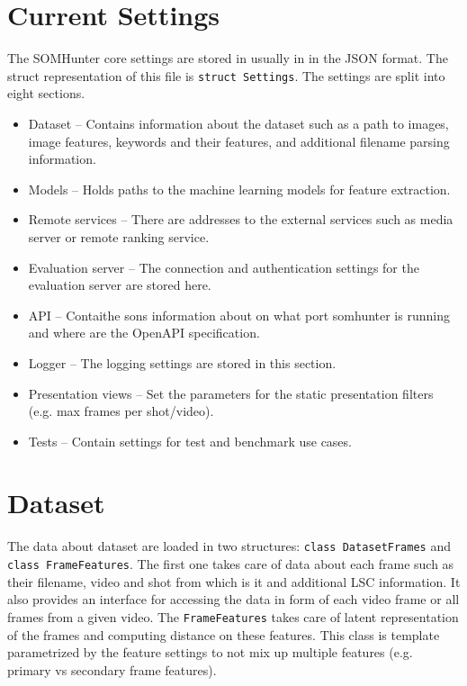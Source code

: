 \section{Current Settings}

The SOMHunter core settings are stored in usually in  in the JSON format. The struct representation of this file is \lstinline{struct Settings}. The settings are split into eight sections.
\begin{itemize}
  \item Dataset -- Contains information about the dataset such as a path to images, image features, keywords and their features, and additional filename parsing information. 
  \item Models -- Holds paths to the machine learning models for feature extraction.
  \item Remote services -- There are addresses to the external services such as media server or remote ranking service.
  \item Evaluation server -- The connection and authentication settings for the evaluation server are stored here.
  \item API -- Contaithe sons information about on what port somhunter is running and where are the OpenAPI specification.
  \item Logger -- The logging settings are stored in this section.
  \item Presentation views -- Set the parameters for the static presentation filters (e.g. max frames per shot/video).
  \item Tests -- Contain settings for test and benchmark use cases.
\end{itemize}

\section{Dataset}

The data about dataset are loaded in two structures: \lstinline{class DatasetFrames} and \lstinline{class FrameFeatures}. The first one takes care of data about each frame such as their filename, video and shot from which is it and additional LSC information. It also provides an interface for accessing the data in form of each video frame or all frames from a given video. The \lstinline{FrameFeatures} takes care of latent representation of the frames and computing distance on these features. This class is template parametrized by the feature settings to not mix up multiple features (e.g. primary vs secondary frame features). 

